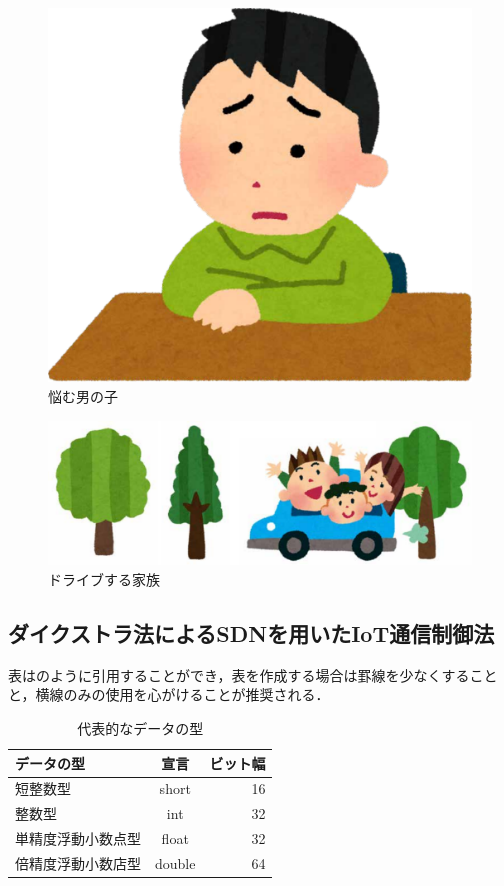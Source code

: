 \documentclass[a4paper,10pt,twocolumn,uplatex]{jsarticle}
\begin{document}
\begin{figure}[!tb]
  \centering
  \includegraphics[width=\linewidth]{img/sample1.pdf}
  \caption{悩む男の子}
  \label{fig:sample1}
\end{figure}

\begin{figure}[!tb]
  \centering
  \includegraphics[width=\linewidth]{img/sample2.pdf}
  \caption{ドライブする家族}
  \label{fig:sample2}
\end{figure}

\subsection{ダイクストラ法によるSDNを用いたIoT通信制御法}
表はのように引用することができ，表を作成する場合は罫線を少なくすることと，横線のみの使用を心がけることが推奨される．

\begin{table}[!bt]
  \caption{代表的なデータの型}
  \label{tab:data_type}
  \centering
  \begin{tabular}{lcr}
    \hline
    データの型         & 宣言   & ビット幅 \\
    \hline \hline
    短整数型           & short  & 16       \\
    整数型             & int    & 32       \\
    単精度浮動小数点型 & float  & 32       \\
    倍精度浮動小数店型 & double & 64       \\
    \hline
  \end{tabular}
\end{table}
\end{document}
